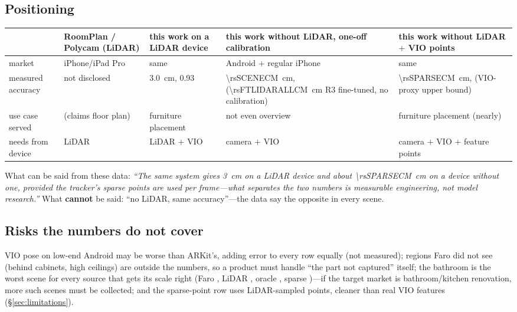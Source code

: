 \subsection{Positioning}
\begin{table}[t]
\centering\small
\begin{tabularx}{\textwidth}{@{}lXXXX@{}}
\toprule
 & RoomPlan / Polycam (LiDAR) & this work on a LiDAR device & this work without LiDAR, one-off calibration & this work without LiDAR $+$ VIO points \\
\midrule
market & iPhone/iPad Pro & same & Android $+$ regular iPhone & same \\
measured accuracy & not disclosed & \SI{3.0}{cm}, \fscore{} 0.93 & \SI{\rsSCENECM}{cm}, \fscore{} \rsSCENEF{} (\SI{\rsFTLIDARALLCM}{cm} R3 fine-tuned, no calibration) & \SI{\rsSPARSECM}{cm}, \fscore{} \rsSPARSEF{} (VIO-proxy upper bound) \\
use case served & (claims floor plan) & furniture placement & not even overview & furniture placement (nearly) \\
needs from device & LiDAR & LiDAR $+$ VIO & camera $+$ VIO & camera $+$ VIO $+$ feature points \\
\bottomrule
\end{tabularx}
\end{table}
What can be said from these data: \emph{``The same system gives \SI{3}{cm} on a LiDAR device and about
\SI{\rsSPARSECM}{cm} on a device without one, provided the tracker's sparse points are used per frame---what separates the
two numbers is measurable engineering, not model research.''} What \textbf{cannot} be said: ``no LiDAR, same
accuracy''---the data say the opposite in every scene.

\subsection{Risks the numbers do not cover}
VIO pose on low-end Android may be worse than ARKit's, adding error to every row equally (not measured); regions Faro
did not see (behind cabinets, high ceilings) are outside the numbers, so a product must handle ``the part not
captured'' itself; the bathroom is the worst scene for every source that gets its scale right (Faro \rsGTd, LiDAR \rsLIDARd, oracle
\rsORACLEd, sparse \rsSPARSEd)---if the target market is
bathroom/kitchen renovation, more such scenes must be collected; and the sparse-point row uses LiDAR-sampled points,
cleaner than real VIO features (\S\ref{sec:limitations}).
